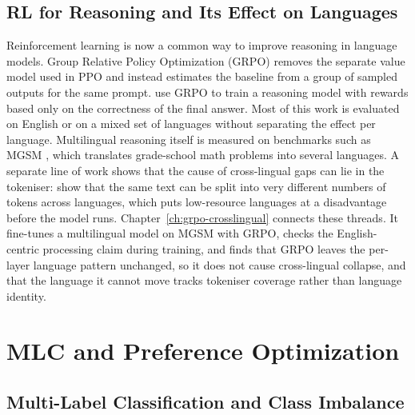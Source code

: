 \subsection{RL for Reasoning and Its Effect on Languages}
\label{sec:rw-crosslingual-rl}

Reinforcement learning is now a common way to improve reasoning in language
models. Group Relative Policy Optimization (GRPO) \citep{shao2024deepseekmath}
removes the separate value model used in PPO and instead estimates the baseline
from a group of sampled outputs for the same prompt. \citet{guo2025deepseekr1}
use GRPO to train a reasoning model with rewards based only on the correctness of
the final answer. Most of this work is evaluated on English or on a mixed set of
languages without separating the effect per language. Multilingual reasoning
itself is measured on benchmarks such as MGSM \citep{shi2022mgsm}, which
translates grade-school math problems into several languages. A separate line of
work shows that the cause of cross-lingual gaps can lie in the tokeniser:
\citet{petrov2023tokenizer} show that the same text can be split into very
different numbers of tokens across languages, which puts low-resource languages at
a disadvantage before the model runs. Chapter~\ref{ch:grpo-crosslingual} connects
these threads. It fine-tunes a multilingual model on MGSM with GRPO, checks the
English-centric processing claim during training, and finds that GRPO leaves the
per-layer language pattern unchanged, so it does not cause cross-lingual collapse,
and that the language it cannot move tracks tokeniser coverage rather than
language identity.

\section{MLC and Preference Optimization}
\label{sec:rw-fairpo}

\subsection{Multi-Label Classification and Class Imbalance}
\label{sec:rw-fairpo-mlc}

